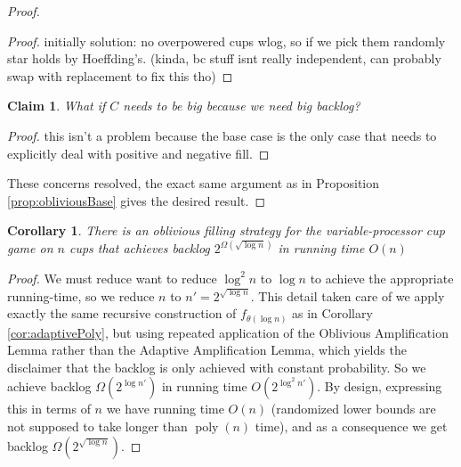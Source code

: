 \documentclass[twocolumn]{article}[11pt]
\DeclareMathOperator{\poly}{\text{poly}}
\newtheorem{clm}{Claim}
\newtheorem{corollary}{Corollary}
\begin{document}
\begin{proof}
\begin{proof}
    initially solution: no overpowered cups wlog, so if we pick them randomly star holds
    by Hoeffding's. (kinda, bc stuff isnt really independent, can probably swap
    with replacement to fix this tho)
  
\end{proof}
\begin{clm}
  What if $C$ needs to be big because we need big backlog? 
\end{clm}
\begin{proof}
 this isn't a problem because the base case is the only case that needs to
 explicitly deal with positive and negative fill.
\end{proof}
These concerns resolved, the exact same argument as in Proposition
\ref{prop:obliviousBase} gives the desired result.

\end{proof}

\begin{corollary}
  \label{cor:obliviousPoly}
  There is an oblivious filling strategy for the variable-processor cup game on
  $n$ cups that achieves backlog $2^{\Omega(\sqrt{\log n})}$ in running time
  $O(n)$
\end{corollary}
\begin{proof}
  We must reduce want to reduce $\log^2 n$ to $\log n$ to achieve the
  appropriate running-time, so we reduce $n$ to $n' = 2^{\sqrt{\log n}}$. This
  detail taken care of we apply exactly the same recursive construction of
  $f_{\theta(\log n)}$ as in Corollary \ref{cor:adaptivePoly}, but using
  repeated application of the Oblivious Amplification Lemma rather than the
  Adaptive Amplification Lemma, which yields the disclaimer that the backlog is
  only achieved with constant probability.
  So we achieve backlog $\Omega(2^{\log n'})$ in running time $O(2^{\log^2
  n'})$. By design, expressing this in terms of $n$ we have running time $O(n)$
  (randomized lower bounds are not supposed to take longer than $\poly(n)$
  time), and as a consequence we get backlog $\Omega(2^{\sqrt{\log n}})$.
\end{proof}




\end{document}
